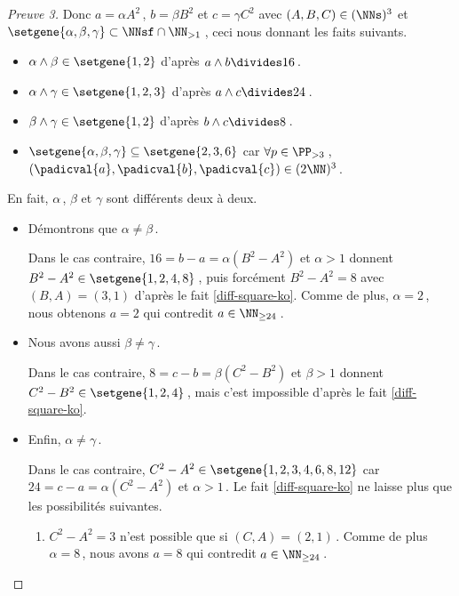 \begin{proof}[Preuve 3]
	Donc 
	$a = \alpha A^2$\,, $b = \beta B^2$ et $c = \gamma C^2$ 
	avec $(A, B, C) \in ( \NNs )^3$
	et
	$\setgene{\alpha, \beta, \gamma} \subset \NNsf \cap \NN_{>1}$\,,
	ceci nous donnant les faits suivants.
    
    \begin{itemize}
		\item $\alpha \wedge \beta \in \setgene{1, 2}$
		d'après $a \wedge b \divides 16$\,.

		\item $\alpha \wedge \gamma \in \setgene{1, 2, 3}$
		d'après $a \wedge c \divides 24$\,.

		\item $\beta \wedge \gamma \in \setgene{1, 2}$
		d'après $b \wedge c \divides 8$\,.

		\item $\setgene{\alpha, \beta, \gamma} \subseteq \setgene{2, 3, 6}$
		car $\forall p \in \PP_{>3}$\,, $(\padicval{a}, \padicval{b}, \padicval{c}) \in ( 2 \NN )^3$\,. 
    \end{itemize}
		
	\medskip

	En fait, $\alpha$\,, $\beta$ et $\gamma$ sont différents deux à deux.
	
    \begin{itemize}	
		\item Démontrons que $\alpha \neq \beta$\,. 
		
		\noindent
		Dans le cas contraire, $16 = b - a = \alpha(B^2 - A^2)$ et $\alpha > 1$ donnent $B^2 - A^2 \in \setgene{1, 2, 4, 8}$\,, puis forcément $B^2 - A^2 = 8$ avec $(B, A) = (3, 1)$ d'après le fait \ref{diff-square-ko}.
		Comme de plus, $\alpha = 2$\,, nous obtenons $a = 2$ qui contredit $a \in \NN_{\geq 24}$\,.		

		\item Nous avons aussi $\beta \neq \gamma$\,. 
		
		\noindent
		Dans le cas contraire, $8 = c - b = \beta(C^2 - B^2)$ et $\beta > 1$ donnent $C^2 - B^2 \in \setgene{1, 2, 4}$\,, mais c'est impossible d'après le fait \ref{diff-square-ko}.
		

		\item Enfin, $\alpha \neq \gamma$\,. 
		
		\noindent
		Dans le cas contraire,
		$C^2 - A^2 \in \setgene{1, 2, 3, 4, 6, 8, 12}$
		car 
		$24 = c - a = \alpha(C^2 - A^2)$ et $\alpha > 1$\,.
		Le fait \ref{diff-square-ko} ne laisse plus que les possibilités suivantes.
		\begin{enumerate}
			\item $C^2 - A^2 = 3$ n'est possible que si $(C, A) = (2, 1)$\,.
			Comme de plus $\alpha = 8$\,, nous avons $a = 8$ qui contredit $a \in \NN_{\geq 24}$\,.
			

\end{enumerate}
\end{itemize}
\end{proof}
